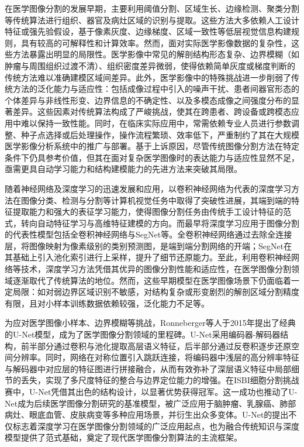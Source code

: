 在医学图像分割的发展早期，主要利用阈值分割、区域生长、边缘检测、聚类分割等传统算法进行组织、器官及病灶区域的识别与提取。这些方法大多依赖人工设计特征或强先验假设，基于像素灰度、边缘梯度、区域一致性等低层视觉信息构建规则，具有较高的可解释性和计算效率。然而，面对实际医学影像数据的复杂性，这些方法暴露出明显的局限性。医学影像中常见的解剖结构形态复杂、边界模糊（如肿瘤与周围组织过渡不清）、组织密度差异微弱，使得依赖简单灰度或梯度判断的传统方法难以准确建模区域间差异。此外，医学影像中的特殊挑战进一步削弱了传统方法的泛化能力与适应性：包括成像过程中引入的噪声干扰、患者间器官形态的个体差异与非线性形变、边界信息的不确定性、以及多模态成像之间强度分布的显著差异\cite{mohdsagheer2020}。这些因素对传统算法构成了严峻挑战，使其在跨患者、跨设备或跨模态应用中难以保持一致性能。同时，在临床实际应用中，常需依赖专业人员进行参数调整、种子点选择或后处理操作，操作流程繁琐、效率低下，严重制约了其在大规模医学影像分析系统中的推广与部署。基于上诉原因，尽管传统图像分割方法在特定条件下仍具参考价值，但其在面对复杂医学图像时的表达能力与适应性显然不足，亟需更具自动学习能力和结构建模能力的先进方法来突破其局限。

随着神经网络及深度学习的迅速发展和应用，以卷积神经网络为代表的深度学习方法在图像分类、检测与分割等计算机视觉任务中取得了突破性进展，其端到端的特征提取能力和强大的表征学习能力，使得图像分割任务由传统手工设计特征的范式，转向自动特征学习与高维特征建模的方向。而最早将深度学习应用于图像分割的代表性模型包括全卷积神经网络与SegNet等。全卷积神经网络通过去除全连接层，将图像映射为像素级别的类别预测图，是端到端分割网络的开端\cite{shelhamer2016}；SegNet在其基础上引入池化索引进行上采样，提升了细节还原能力。至此，利用卷积神经网络等技术，深度学习方法凭借其优异的图像分割性能和适应性，在医学图像分割领域逐渐取代了传统算法的地位。然而，这些早期模型在医学图像场景下仍面临着一定局限：如对弱边界区域识别不敏感，对结构复杂或形变剧烈的解剖区域分割精度有限，且对小样本训练数据依赖较强，泛化能力不足等。

为应对医学图像小样本、边界模糊等挑战，Ronneberger等人\cite{ronneberger2015}于2015年提出了经典的U-Net模型，成为了医学图像分割领域的里程碑。U-Net采用编码器-解码器结构，前半部分通过卷积与池化提取高层语义特征，后半部分通过反卷积逐步还原空间分辨率。同时，网络在对称位置引入跳跃连接，将编码器中浅层的高分辨率特征与解码器中对应层的特征图进行拼接融合，从而有效弥补了深层语义特征中局部细节的丢失，实现了多尺度特征的整合与边界定位能力的增强。在ISBI细胞分割挑战赛中，U-Net凭借其出色的结构设计，以显著优势获得冠军。这一成功也推动了U-Net成为后续医学图像分割研究的基准模型，被广泛应用于脑肿瘤、乳腺癌、肺部病灶、眼底血管、皮肤病变等多种应用场景，并衍生出众多变体。U-Net的提出不仅标志着深度学习在医学图像分割领域的广泛应用起点，也为融合传统知识与深度模型提供了范式基础，奠定了现代医学图像分割算法的主流框架。

